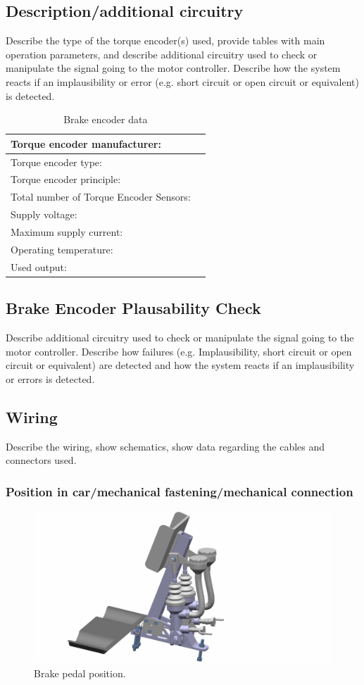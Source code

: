 \subsection{Description/additional circuitry}
Describe the type of the torque encoder(s) used, provide tables with main operation parameters, and describe additional circuitry used to check or manipulate the signal going to the motor controller. Describe how the system reacts if an implausibility or error (e.g. short circuit or open circuit or equivalent) is detected.

\begin{table}[H]
	\centering
	\caption{Brake encoder data}
	\begin{tabularx}{\textwidth}{|X|X|}
		\hline
		Torque encoder manufacturer: &  \\[\TableSize]\hline
		Torque encoder type: &  \\[\TableSize]\hline
		Torque encoder principle: &  \\[\TableSize]\hline
		Total number of Torque Encoder Sensors: &  \\[\TableSize]\hline
		Supply voltage: &  \\[\TableSize]\hline
		Maximum supply current: &  \\[\TableSize]\hline
		Operating temperature: &  \\[\TableSize]\hline
		Used output: &  \\[\TableSize]\hline
	\end{tabularx}%
	\label{tab:brake-general}%
\end{table}%

\subsection{Brake Encoder Plausability Check}
Describe additional circuitry used to check or manipulate the signal going to the motor controller. Describe how failures (e.g. Implausibility, short circuit or open circuit or equivalent) are detected and how the system reacts if an implausibility or errors is detected.

\subsection{Wiring}
Describe the wiring, show schematics, show data regarding the cables and connectors used.

\subsubsection{Position in car/mechanical fastening/mechanical connection}

\begin{figure}[H]
	\centering
	\includegraphics[width=.5\textwidth]{./img/BRK-pos.jpg}
	\caption{Brake pedal position.}
	\label{fig:BRK-position}
\end{figure}



